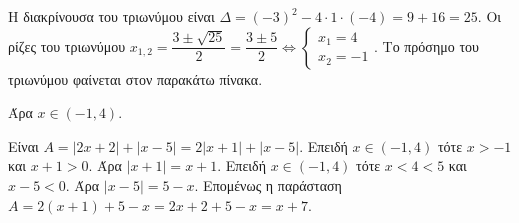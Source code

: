 
\begin{alist}
\item Η διακρίνουσα του τριωνύμου είναι $\Delta = (-3)^2 - 4 \cdot 1 \cdot (-4) = 9 + 16 = 25$.
Οι ρίζες του τριωνύμου $x_{1,2} = \dfrac{3 \pm \sqrt{25}}{2} = \dfrac{3 \pm 5}{2} \Leftrightarrow \begin{cases} x_1 = 4 \\ x_2 = -1 \end{cases}$.
Το πρόσημο του τριωνύμου φαίνεται στον παρακάτω πίνακα.
\begin{center}
\end{center}
Άρα $x \in (-1, 4)$.

\item Είναι $A = |2x + 2| + |x - 5| = 2|x + 1| + |x - 5|$.
Επειδή $x \in (-1, 4)$ τότε $x > -1$ και $x + 1 > 0$. Άρα $|x + 1| = x + 1$.
Επειδή $x \in (-1, 4)$ τότε $x < 4 < 5$ και $x - 5 < 0$. Άρα $|x - 5| = 5 - x$.
Επομένως η παράσταση $A = 2(x + 1) + 5 - x = 2x + 2 + 5 - x = x + 7$.
\end{alist}

